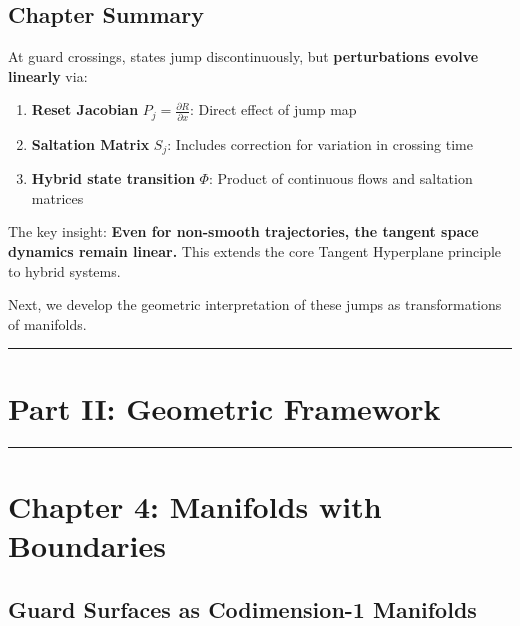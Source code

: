 \documentclass[
  letterpaper,
  DIV=11,
  numbers=noendperiod]{scrartcl}
\providecommand{\tightlist}{%
  \setlength{\itemsep}{0pt}\setlength{\parskip}{0pt}}\usepackage{longtable,booktabs,array}
\begin{document}
\subsection{Chapter Summary}\label{chapter-summary-2}

At guard crossings, states jump discontinuously, but
\textbf{perturbations evolve linearly} via:

\begin{enumerate}
\def\labelenumi{\arabic{enumi}.}
\tightlist
\item
  \textbf{Reset Jacobian} \(P_j = \frac{\partial R}{\partial x}\):
  Direct effect of jump map
\item
  \textbf{Saltation Matrix} \(S_j\): Includes correction for variation
  in crossing time
\item
  \textbf{Hybrid state transition} \(\Phi\): Product of continuous flows
  and saltation matrices
\end{enumerate}

The key insight: \textbf{Even for non-smooth trajectories, the tangent
space dynamics remain linear.} This extends the core Tangent Hyperplane
principle to hybrid systems.

Next, we develop the geometric interpretation of these jumps as
transformations of manifolds.

\begin{center}\rule{0.5\linewidth}{0.5pt}\end{center}

\section*{Part II: Geometric
Framework}\label{part-ii-geometric-framework}

\begin{center}\rule{0.5\linewidth}{0.5pt}\end{center}

\section{Chapter 4: Manifolds with
Boundaries}\label{sec-manifolds-boundaries}

\subsection{Guard Surfaces as Codimension-1
Manifolds}\label{guard-surfaces-as-codimension-1-manifolds}
\end{document}
